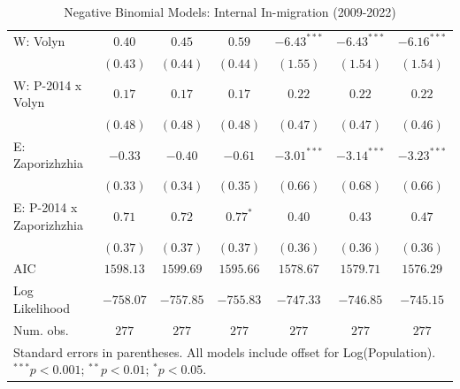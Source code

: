 \begin{table}
\begin{center}
\begin{small}
\begin{tabular}{l c c c c c c}
W: Volyn                    & $0.40$        & $0.45$       & $0.59$        & $-6.43^{***}$  & $-6.43^{***}$  & $-6.16^{***}$  \\
                            & $(0.43)$      & $(0.44)$     & $(0.44)$      & $(1.55)$       & $(1.54)$       & $(1.54)$       \\
W: P-2014 x Volyn           & $0.17$        & $0.17$       & $0.17$        & $0.22$         & $0.22$         & $0.22$         \\
                            & $(0.48)$      & $(0.48)$     & $(0.48)$      & $(0.47)$       & $(0.47)$       & $(0.46)$       \\
E: Zaporizhzhia             & $-0.33$       & $-0.40$      & $-0.61$       & $-3.01^{***}$  & $-3.14^{***}$  & $-3.23^{***}$  \\
                            & $(0.33)$      & $(0.34)$     & $(0.35)$      & $(0.66)$       & $(0.68)$       & $(0.66)$       \\
E: P-2014 x Zaporizhzhia    & $0.71$        & $0.72$       & $0.77^{*}$    & $0.40$         & $0.43$         & $0.47$         \\
                            & $(0.37)$      & $(0.37)$     & $(0.37)$      & $(0.36)$       & $(0.36)$       & $(0.36)$       \\
\hline
AIC                         & $1598.13$     & $1599.69$    & $1595.66$     & $1578.67$      & $1579.71$      & $1576.29$      \\
Log Likelihood              & $-758.07$     & $-757.85$    & $-755.83$     & $-747.33$      & $-746.85$      & $-745.15$      \\
Num. obs.                   & $277$         & $277$        & $277$         & $277$          & $277$          & $277$          \\
\hline
\multicolumn{7}{l}{\tiny{Standard errors in parentheses. All models include offset for Log(Population). $^{***}p<0.001$; $^{**}p<0.01$; $^{*}p<0.05$.}}
\end{tabular}
\end{small}
\caption{Negative Binomial Models: Internal In-migration (2009-2022)}
\label{tab:in_migration}
\end{center}
\end{table}
